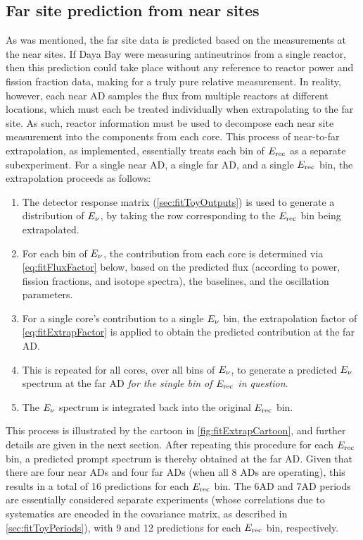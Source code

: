 \documentclass[../thesis.tex]{subfiles}
\begin{document}
\subsection{Far site prediction from near sites}
\label{sec:fitNearToFarPred}

As was mentioned, the far site data is predicted based on the measurements at the near sites. If Daya Bay were measuring antineutrinos from a single reactor, then this prediction could take place without any reference to reactor power and fission fraction data, making for a truly pure relative measurement. In reality, however, each near AD samples the flux from multiple reactors at different locations, which must each be treated individually when extrapolating to the far site. As such, reactor information must be used to decompose each near site measurement into the components from each core. This process of near-to-far extrapolation, as implemented, essentially treats each bin of $E_\mathrm{rec}$ as a separate subexperiment. For a single near AD, a single far AD, and a single $E_\mathrm{rec}$ bin, the extrapolation proceeds as follows:

\begin{enumerate}
\item The detector response matrix (\autoref{sec:fitToyOutputs}) is used to generate a distribution of $E_\mathrm{\nu}$, by taking the row corresponding to the $E_\mathrm{rec}$ bin being extrapolated.
\item For each bin of $E_\mathrm{\nu}$, the contribution from each core is determined via \autoref{eq:fitFluxFactor} below, based on the predicted flux (according to power, fission fractions, and isotope spectra), the baselines, and the oscillation parameters.
\item For a single core's contribution to a single $E_\mathrm{\nu}$ bin, the extrapolation factor of \autoref{eq:fitExtrapFactor} is applied to obtain the predicted contribution at the far AD.
\item This is repeated for all cores, over all bins of $E_\mathrm{\nu}$, to generate a predicted $E_\mathrm{\nu}$ spectrum at the far AD \emph{for the single bin of $E_\mathrm{rec}$ in question}.
\item The $E_\mathrm{\nu}$ spectrum is integrated back into the original $E_\mathrm{rec}$ bin.
\end{enumerate}

This process is illustrated by the cartoon in \autoref{fig:fitExtrapCartoon}, and further details are given in the next section. After repeating this procedure for each $E_\mathrm{rec}$ bin, a predicted prompt spectrum is thereby obtained at the far AD. Given that there are four near ADs and four far ADs (when all 8 ADs are operating), this results in a total of 16 predictions for each $E_\mathrm{rec}$ bin. The 6AD and 7AD periods are essentially considered separate experiments (whose correlations due to systematics are encoded in the covariance matrix, as described in \autoref{sec:fitToyPeriods}), with 9 and 12 predictions for each $E_\mathrm{rec}$ bin, respectively.
\end{document}
